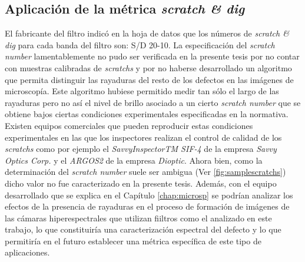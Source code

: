\singlespacing
\subsection{Aplicación de la métrica \textit{scratch \& dig}}
\label{sec:sctdig}

\hspace{0.5cm}El fabricante del filtro indicó en la hoja de datos que los números de \textit{scratch \& dig} para cada banda del filtro son: S/D 20-10. La especificación del \textit{scratch number} lamentablemente no pudo ser verificada en la presente tesis por no contar con muestras calibradas de \textit{scratchs} y por no haberse desarrollado un algoritmo que permita distinguir las rayaduras del resto de los defectos en las imágenes de microscopía. Este algoritmo hubiese permitido medir tan sólo el largo de las rayaduras pero no así el nivel de brillo asociado a un cierto \textit{scratch number} que se obtiene bajos ciertas condiciones experimentales especificadas en la normativa. Existen equipos comerciales que pueden reproducir estas condiciones experimentales en las que los inspectores realizan el control de calidad de los \textit{scratchs} como por ejemplo el \textit{SavvyInspectorTM SIF-4} de la empresa \textit{Savvy Optics Corp.} y el \textit{ARGOS2} de la empresa \textit{Dioptic}. Ahora bien, como la determinación del \textit{scratch number} suele ser ambigua (Ver \ref{fig:samplescratchs}) dicho valor no fue caracterizado en la presente tesis. Además, con el equipo desarrollado que se explica en el Capítulo \ref{chap:microsp} se podrían analizar los efectos de la presencia de rayaduras en el proceso de formación de imágenes de las cámaras hiperespectrales que utilizan fiiltros como el analizado en este trabajo, lo que constituiría una caracterización espectral del defecto y lo que permitiría en el futuro establecer una métrica específica de este tipo de aplicaciones.



